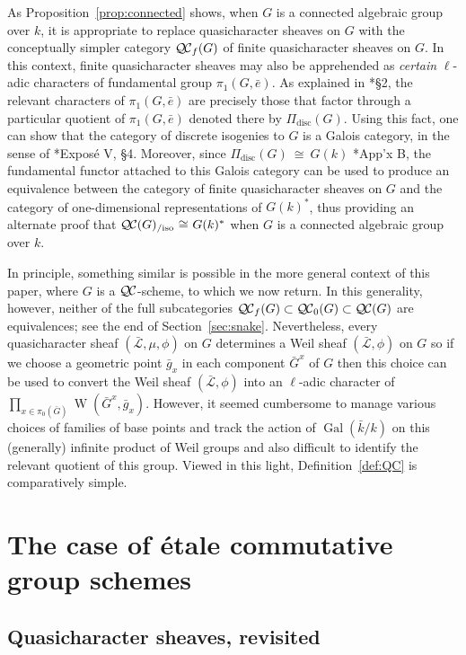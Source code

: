 \documentclass{amsart}
\theoremstyle{plain}
\theoremstyle{definition}
\theoremstyle{remark}
\newcommand{\bFq}{\bar{k}}
\newcommand{\Fq}{k}
\DeclareMathOperator{\Gal}{Gal}
\DeclareMathOperator{\W}{W}
\newcommand{\iso}{{\ \cong\ }}
\newcommand{\gqcs}[1]{{\mathcal{\bar #1}}}
\newcommand{\QC}{{\mathcal{Q\hskip-0.8pt C}}}
\newcommand{\QCb}{{\QC_0}}
\newcommand{\QCf}{{\QC_f}}
\newcommand{\QCiso}[1]{\QC(#1)_{/\text{iso}}}
\newcommand{\bG}{\bar{G}}
\begin{document}
As Proposition~\ref{prop:connected} shows,
when $G$ is a connected algebraic group over $\Fq$,
it is appropriate to replace quasicharacter sheaves on $G$
with the conceptually simpler category $\QCf(G)$ of finite quasicharacter sheaves on $G$.
In this context, finite quasicharacter sheaves may also be apprehended as
\emph{certain} $\ell$-adic characters of fundamental group $\pi_1(G,{\bar e})$.
As explained in \cite{kamgarpour:09a}*{\S2},
the relevant characters of $\pi_1(G,{\bar e})$ are precisely those
that factor through a particular quotient of $\pi_1(G,{\bar e})$
denoted there by $\Pi_\text{disc}(G)$.
Using this fact, one can show that the category of discrete isogenies to $G$ is a Galois category,
in the sense of \cite{grothendieck:SGA1}*{Expos\'e V, \S 4}.
Moreover, since $\Pi_\text{disc}(G) \iso G(\Fq)$ \cite{kamgarpour:09a}*{App'x B},
the fundamental functor attached to this Galois category can be used to produce an equivalence
between the category of finite quasicharacter sheaves on $G$ and
the category of one-dimensional representations of $G(\Fq)^*$, thus
providing an alternate proof that $\QCiso{G} \iso G(\Fq)^*$
when $G$ is a connected algebraic group over $\Fq$.

In principle, something similar is possible in the more general
context of this paper, where $G$ is a $\QC$-scheme, to which we now return.
In this generality, however, neither of the full subcategories $\QCf(G) \subset \QCb(G) \subset \QC(G)$ are equivalences;
see the end of Section~\ref{sec:snake}.
Nevertheless, every quasicharacter sheaf $(\gqcs{L},\mu,\phi)$ on $G$
determines a Weil sheaf $(\gqcs{L},\phi)$ on $G$
so if we choose a geometric point ${\bar g}_x$ in each component $\bG^x$ of $G$
then this choice can be used to convert
the Weil sheaf $(\gqcs{L},\phi)$ into an $\ell$-adic character of $\prod_{x\in \pi_0(\bG)}\W(\bG^x, {\bar g}_x)$.
However, it seemed cumbersome to manage various
choices of families of base points and track the action
of $\Gal(\bFq/\Fq)$ on this (generally) infinite product of
Weil groups and also difficult to identify the relevant quotient of this group.
Viewed in this light, Definition~\ref{def:QC} is comparatively simple.

\section{The case of \'etale commutative group schemes} \label{sec:etale}

\subsection{Quasicharacter sheaves, revisited}
\end{document}
